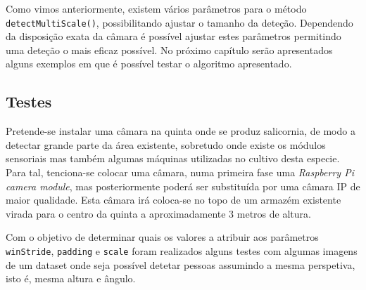 Como vimos anteriormente, existem vários parâmetros para o método \linebreak \texttt{detectMultiScale()}, possibilitando ajustar o tamanho da deteção. Dependendo da disposição exata da câmara é possível ajustar estes parâmetros permitindo uma deteção o mais eficaz possível. No próximo capítulo serão apresentados alguns exemplos em que é possível testar o algoritmo apresentado.  



























\iffalse


\subsection{Testes}

Pretende-se instalar uma câmara na quinta onde se produz salicornia, de modo a detectar grande parte da área existente, sobretudo onde existe os módulos sensoriais mas também algumas máquinas utilizadas no cultivo desta especie. Para tal, tenciona-se colocar uma câmara, numa primeira fase uma \textit{Raspberry Pi camera module}, mas posteriormente poderá ser substituída por uma câmara IP de maior qualidade. Esta câmara irá coloca-se no topo de um armazém existente virada para o centro da quinta a aproximadamente 3 metros de altura. 

Com o objetivo de determinar quais os valores a atribuir aos parâmetros \texttt{winStride}, \texttt{padding} e \texttt{scale} foram realizados alguns testes com algumas imagens de um dataset onde seja possível detetar pessoas assumindo a mesma perspetiva, isto é, mesma altura e ângulo.  

